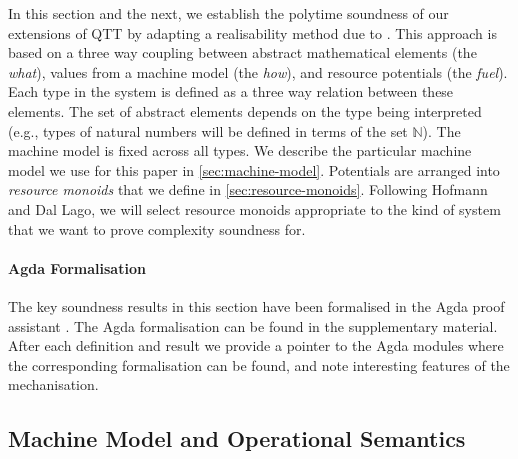 \documentclass[acmsmall,review,screen,anonymous]{acmart}
\begin{document}
\newcommand{\ExpSet}{\mathcal{E}}
\newcommand{\ValSet}{\mathcal{V}}

\newcommand{\rplus}{\oplus}
\newcommand{\rzero}{\emptyset}

In this section and the next, we establish the polytime soundness of
our extensions of QTT by adapting a realisability method due to
\cite{hofmann-dallago}. This approach is based on a three way coupling
between abstract mathematical elements (the \emph{what}), values from
a machine model (the \emph{how}), and resource potentials (the
\emph{fuel}). Each type in the system is defined as a three way
relation between these elements. The set of abstract elements depends
on the type being interpreted (e.g., types of natural numbers will be
defined in terms of the set $\mathbb{N}$). The machine model is fixed
across all types. We describe the particular machine model we use for
this paper in \autoref{sec:machine-model}. Potentials are arranged
into \emph{resource monoids} that we define in
\autoref{sec:resource-monoids}. Following Hofmann and Dal Lago, we
will select resource monoids appropriate to the kind of system that we
want to prove complexity soundness for.

\paragraph{Agda Formalisation} The key soundness results in this
section have been formalised in the Agda proof assistant
\cite{agda}. The Agda formalisation can be found in the supplementary
material. After each definition and result we provide a pointer to the
Agda modules where the corresponding formalisation can be found, and
note interesting features of the mechanisation.

\subsection{Machine Model and Operational Semantics}
\label{sec:machine-model}
\end{document}

